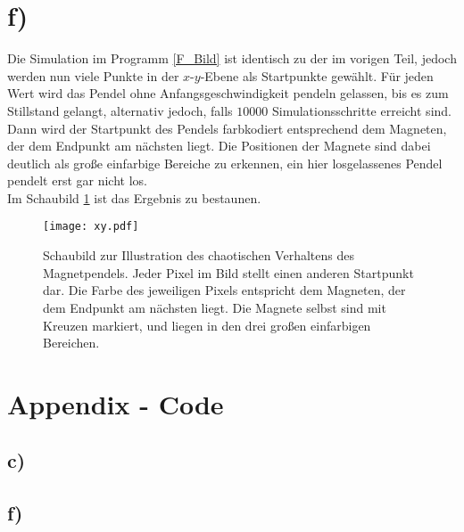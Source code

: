 \section*{f)}
Die Simulation im Programm \ref{F_Bild} ist identisch zu der im vorigen Teil, jedoch werden nun viele Punkte in der $x$-$y$-Ebene als Startpunkte gewählt. Für jeden Wert wird das Pendel ohne Anfangsgeschwindigkeit pendeln gelassen, bis es zum Stillstand gelangt, alternativ jedoch, falls $10000$ Simulationsschritte erreicht sind. Dann wird der Startpunkt des Pendels farbkodiert entsprechend dem Magneten, der dem Endpunkt am nächsten liegt. Die Positionen der Magnete sind dabei deutlich als große einfarbige Bereiche zu erkennen, ein hier losgelassenes Pendel pendelt erst gar nicht los.\\
Im Schaubild \ref{fig:Bild} ist das Ergebnis zu bestaunen.


\begin{figure}[t]
	\centering
	\texttt{[image: xy.pdf]}
	\caption{Schaubild zur Illustration des chaotischen Verhaltens des Magnetpendels. Jeder Pixel im Bild stellt einen anderen Startpunkt dar. Die Farbe des jeweiligen Pixels entspricht dem Magneten, der dem Endpunkt am nächsten liegt. Die Magnete selbst sind mit Kreuzen markiert, und liegen in den drei großen einfarbigen Bereichen.}
	\label{fig:Bild}
\end{figure}

\clearpage
\section*{Appendix - Code}
\subsection*{c)}


\clearpage
\subsection*{f)}




